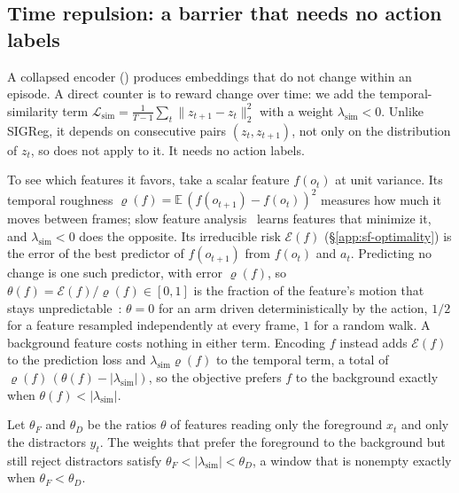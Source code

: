 \subsection{Time repulsion: a barrier that needs no action labels}
\label{app:sf-simt}

A collapsed encoder () produces embeddings that do not change within an
episode. A direct counter is to reward change over time: we add the temporal-similarity term
$\mathcal{L}_{\mathrm{sim}} = \frac{1}{T-1}\sum_t\|z_{t+1}-z_t\|_2^2$ with a weight
$\lambda_{\mathrm{sim}} < 0$. Unlike SIGReg, it depends on consecutive pairs $(z_t,z_{t+1})$, not
only on the distribution of $z_t$, so  does not apply to it. It
needs no action labels.

To see which features it favors, take a scalar feature $f(o_t)$ at unit variance. Its
temporal roughness $\varrho(f) = \mathbb{E}\,(f(o_{t+1})-f(o_t))^2$ measures how much it moves
between frames; slow feature analysis~\citep{wiskott2002slow} learns features that minimize
it, and $\lambda_{\mathrm{sim}} < 0$ does the opposite. Its irreducible risk $\mathcal{E}(f)$
(\S\ref{app:sf-optimality}) is the error of the best predictor of $f(o_{t+1})$ from $f(o_t)$
and $a_t$. Predicting no change is one such predictor, with error $\varrho(f)$, so
$\theta(f) = \mathcal{E}(f)/\varrho(f) \in [0,1]$ is the fraction of the feature's motion that
stays unpredictable~\citep{weghenkel2018slowness_predictability}: $\theta = 0$ for an arm
driven deterministically by the action, $1/2$ for a feature resampled independently at every
frame, $1$ for a random walk. A background feature costs nothing in either term. Encoding $f$
instead adds $\mathcal{E}(f)$ to the prediction loss and $\lambda_{\mathrm{sim}}\varrho(f)$ to
the temporal term, a total of $\varrho(f)\,(\theta(f)-|\lambda_{\mathrm{sim}}|)$, so the
objective prefers $f$ to the background exactly when $\theta(f) < |\lambda_{\mathrm{sim}}|$.

Let $\theta_F$ and $\theta_D$ be the ratios $\theta$ of features reading only the foreground $x_t$
and only the distractors $y_t$. The weights that prefer the foreground to the background but
still reject distractors satisfy $\theta_F < |\lambda_{\mathrm{sim}}| < \theta_D$, a window that is
nonempty exactly when $\theta_F < \theta_D$.

